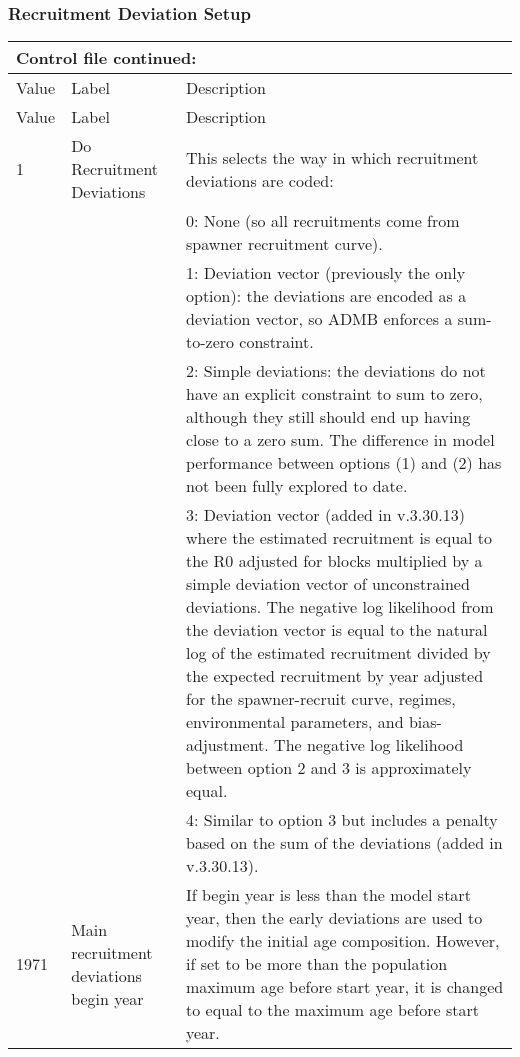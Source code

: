 \subsubsection{Recruitment Deviation Setup}
\begin{longtable}{p{1cm} p{3cm} p{11cm}}
	\multicolumn{3}{l}{Control file continued:}\\

	\hline
	Value & Label &  Description\Tstrut\Bstrut\\
	\hline
	\endfirsthead

	\hline
	Value & Label &  Description\Tstrut\Bstrut\\
	\hline
	\endhead
	\hline
	\endfoot
	\endlastfoot


	1 \Tstrut & Do Recruitment Deviations & This selects the way in which recruitment deviations are coded:\\
	  &  & 0: None (so all recruitments come from spawner recruitment curve).\\
	  &  & 1: Deviation vector (previously the only option): the deviations are encoded as a deviation vector, so ADMB enforces a sum-to-zero constraint.\\
	  &  & 2: Simple deviations: the deviations do not have an explicit constraint to sum to zero, although they still should end up having close to a zero sum. The difference in model performance between options (1) and (2) has not been fully explored to date.\\
	  &  & 3: Deviation vector (added in v.3.30.13) where the estimated recruitment is equal to the R0 adjusted for blocks multiplied by a simple deviation vector of unconstrained deviations. The negative log likelihood from the deviation vector is equal to the natural log of the estimated recruitment divided by the expected recruitment by year adjusted for the spawner-recruit curve, regimes, environmental parameters, and bias-adjustment. The negative log likelihood between option 2 and 3 is approximately equal. \\
	  & & 4: Similar to option 3 but includes a penalty based on the sum of the deviations (added in v.3.30.13).\\
	\hline

	1971 \Tstrut & Main recruitment deviations begin year & If begin year is less than the model start year, then the early deviations are used to modify the initial age composition.   However, if set to be more than the population maximum age before start year, it is changed to equal to the maximum age before start year. \Bstrut\\
	\hline


\end{longtable}
